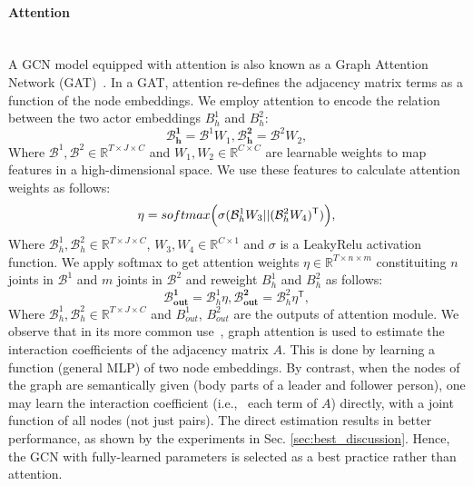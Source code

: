 \documentclass[10pt,twocolumn,letterpaper]{article}
\begin{document}
\paragraph{Attention} ~\\
A GCN model equipped with attention is also known as a Graph Attention Network (GAT)~\cite{velickovic18}. In a GAT, attention re-defines the adjacency matrix terms as a function of the node embeddings. We employ attention to encode the relation between the two actor embeddings ${B}_{h}^1$ and ${B}_{h}^2$:
\begin{equation}
    \label{eq:pain}
    {\mathbf{\mathcal{B}_{h}^1}} = {\mathcal{B}}^1 {W_{1}}, {\mathbf{\mathcal{B}_{h}^2}} = {\mathcal{B}}^2 {W_{2}},
\end{equation}
Where ${\mathcal{B}^1}, {\mathcal{B}^2} \in \mathbb{R}^{T \times J \times C}$ and $W_{1}, W_{2} \in \mathbb{R}^{C \times C}$ are learnable weights to map features in a high-dimensional space. We use these features to calculate attention weights as follows:
\begin{equation}
    \label{eq:pattention}
    {\mathbf{\eta}} = softmax\Bigl(\sigma({{\mathcal{B}}_{h}^1} {W_{3}} || ({{\mathcal{B}}_{h}^2} {W_{4}})^{\mathsf{T}})\Bigr),
\end{equation}
Where ${\mathcal{B}_{h}^1}, {\mathcal{B}_{h}^2} \in \mathbb{R}^{T \times J \times C}$, $W_{3}, W_{4}   \in \mathbb{R}^{C \times 1}$ and $\sigma$ is a LeakyRelu activation function. We apply softmax to get attention weights $\eta \in \mathbb{R}^{T \times n \times m}$ constituiting $n$ joints in $\mathcal{B}^1$ and $m$ joints in $\mathcal{B}^2$ and reweight ${B}_{h}^1$ and ${B}_{h}^2$ as follows: 
\begin{equation}
    \label{eq:paout1}
    {\mathbf{\mathcal{B}_{out}^1}} = {\mathcal{B}}_{h}^1 {\eta},{\mathbf{\mathcal{B}_{out}^2}} = {\mathcal{B}}_{h}^2 {\eta^{\mathsf{T}}},
\end{equation}
Where ${\mathcal{B}_{h}^1}, {\mathcal{B}_{h}^2} \in \mathbb{R}^{T \times J \times C}$ and $B_{out}^1$, $B_{out}^2$ are the outputs of attention module. 
We observe that in its more common use~\cite{velickovic18}, graph attention is used to estimate the interaction coefficients of the adjacency matrix $A$.
This is done by learning a function (general MLP) of two node embeddings.
By contrast, when the nodes of the graph are semantically given (body parts of a leader and follower person), one may learn the interaction coefficient (i.e., \ each term of $A$) directly, with a joint function of all nodes (not just pairs).
The direct estimation results in better performance, as shown by the experiments in Sec. \ref{sec:best_discussion}. Hence, the GCN with fully-learned parameters is selected as a best practice rather than attention.
\end{document}
